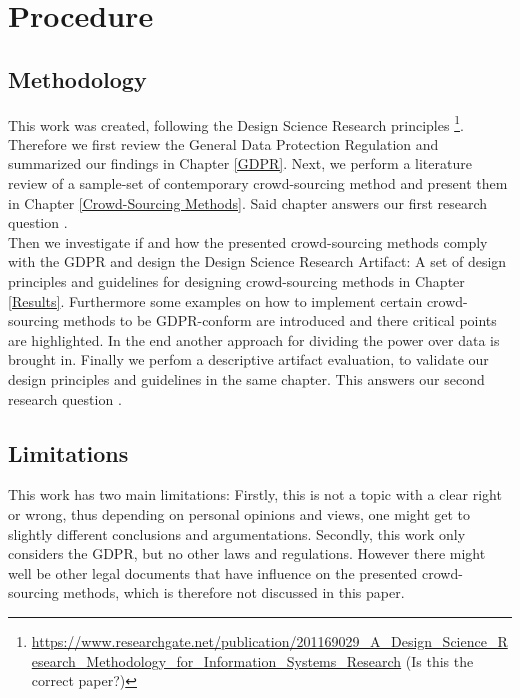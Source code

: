 \documentclass[a4paper,12pt]{report}
\begin{document}
	
	\chapter{Procedure}
	
	\section{Methodology}
	\startsection
		This work was created, following the Design Science Research principles \footnote{\url{https://www.researchgate.net/publication/201169029_A_Design_Science_Research_Methodology_for_Information_Systems_Research} (Is this the correct paper?)}.
		Therefore we first review the General Data Protection Regulation and summarized our findings in Chapter \ref{GDPR}.
		Next, we perform a literature review of a sample-set of contemporary crowd-sourcing method and present them in Chapter \ref{Crowd-Sourcing Methods}.
		Said chapter answers our first research question . \\
		Then we investigate if and how the presented crowd-sourcing methods comply with the GDPR and design the Design Science Research Artifact: A set of design principles and guidelines for designing crowd-sourcing methods in Chapter \ref{Results}. Furthermore some examples on how to implement certain crowd-sourcing methods to be GDPR-conform are introduced and there critical points are highlighted. In the end another approach for dividing the power over data is brought in.
		Finally we perfom a descriptive artifact evaluation, to validate our design principles and guidelines in the same chapter.
		This answers our second research question .
	\closesection
	
	\section{Limitations}
	\startsection
		This work has two main limitations:
		Firstly, this is not a topic with a clear right or wrong, thus depending on personal opinions and views, one might get to slightly different conclusions and argumentations.
		Secondly, this work only considers the GDPR, but no other laws and regulations.
		However there might well be other legal documents that have influence on the presented crowd-sourcing methods, which is therefore not discussed in this paper.
	\closesection
\end{document}
